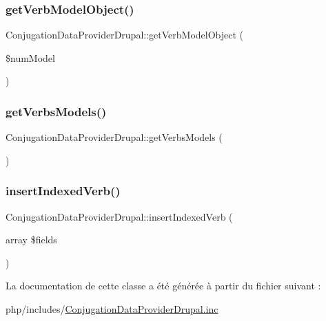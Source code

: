 \hypertarget{class_conjugation_data_provider_drupal_a2b10d06d5bab8f2315641a27aaf2f6b6}{}\label{class_conjugation_data_provider_drupal_a2b10d06d5bab8f2315641a27aaf2f6b6} 
\subsubsection{\texorpdfstring{get\+Verb\+Model\+Object()}{getVerbModelObject()}}
{\footnotesize\ttfamily Conjugation\+Data\+Provider\+Drupal\+::get\+Verb\+Model\+Object (\begin{DoxyParamCaption}\item[{}]{\$num\+Model }\end{DoxyParamCaption})}

\hypertarget{class_conjugation_data_provider_drupal_af59dd940255f031f93d01ed07ccccbc4}{}\label{class_conjugation_data_provider_drupal_af59dd940255f031f93d01ed07ccccbc4} 
\subsubsection{\texorpdfstring{get\+Verbs\+Models()}{getVerbsModels()}}
{\footnotesize\ttfamily Conjugation\+Data\+Provider\+Drupal\+::get\+Verbs\+Models (\begin{DoxyParamCaption}{ }\end{DoxyParamCaption})}

\hypertarget{class_conjugation_data_provider_drupal_a3a8340c3d8abaa7e28f2f84c8c00a307}{}\label{class_conjugation_data_provider_drupal_a3a8340c3d8abaa7e28f2f84c8c00a307} 
\subsubsection{\texorpdfstring{insert\+Indexed\+Verb()}{insertIndexedVerb()}}
{\footnotesize\ttfamily Conjugation\+Data\+Provider\+Drupal\+::insert\+Indexed\+Verb (\begin{DoxyParamCaption}\item[{array}]{\$fields }\end{DoxyParamCaption})}



La documentation de cette classe a été générée à partir du fichier suivant \+:\begin{DoxyCompactItemize}
\item 
php/includes/\hyperlink{_conjugation_data_provider_drupal_8inc}{Conjugation\+Data\+Provider\+Drupal.\+inc}\end{DoxyCompactItemize}
